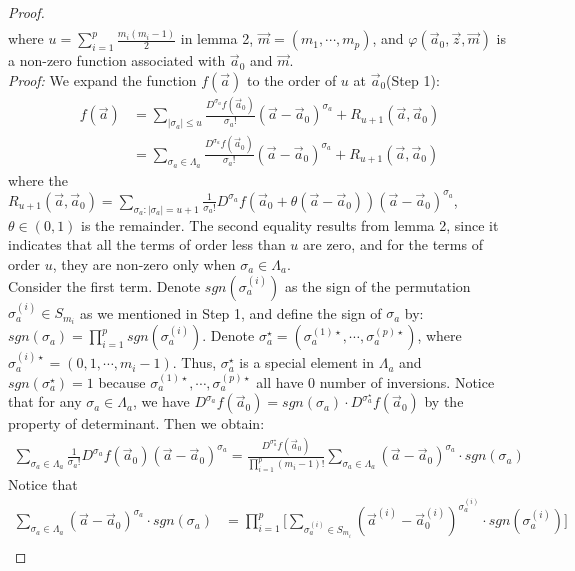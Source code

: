 \begin{proof}
\begin{align*}
\end{align*}
where $u=\sum_{i=1}^{p}\frac{m_{i}(m_{i}-1)}{2}$ in lemma 2, $\vec{m}=(m_{1},\cdots,m_{p})$, and $\varphi(\vec{a}_{0},\vec{z},\vec{m})$ is a non-zero function associated with $\vec{a}_{0}$ and $\vec{m}$.\\
\emph{Proof:} We expand the function $f(\vec{a})$ to the order of $u$ at $\vec{a}_{0}$(Step 1):
\begin{align*}
	f(\vec{a})&=\sum_{|\sigma_{a}|\leqslant u}\frac{D^{\sigma_{a}}f(\vec{a}_{0})}{\sigma_{a}!}(\vec{a}-\vec{a}_{0})^{\sigma_{a}}+R_{u+1}(\vec{a},\vec{a}_{0})\\
	&= \sum_{\sigma_{a}\in \Lambda_{a}}\frac{D^{\sigma_{a}}f(\vec{a}_{0})}{\sigma_{a}!}(\vec{a}-\vec{a}_{0})^{\sigma_{a}}+R_{u+1}(\vec{a},\vec{a}_{0})
\end{align*} 
where the $R_{u+1}(\vec{a},\vec{a}_{0})=\sum_{\sigma_{a}:|\sigma_{a}|=u+1}\frac{1}{\sigma_{a}!}D^{\sigma_{a}}f(\vec{a}_{0}+\theta(\vec{a}-\vec{a}_{0}))(\vec{a}-\vec{a}_{0})^{\sigma_{a}}$, $\theta\in(0,1)$ is the remainder. The second equality results from lemma 2, since it indicates that all the terms of order less than $u$ are zero, and for the terms of order $u$, they are non-zero only when $\sigma_{a}\in\Lambda_{a}$.\\
Consider the first term. Denote $sgn(\sigma_{a}^{(i)})$ as the sign of the permutation $\sigma_{a}^{(i)}\in S_{m_i}$ as we mentioned in Step 1, and define the sign of $\sigma_{a}$ by: $sgn(\sigma_{a})=\prod_{i=1}^{p}sgn(\sigma_{a}^{(i)})$. Denote $\sigma_{a}^{\star}=(\sigma_{a}^{(1)\star},\cdots,\sigma_{a}^{(p)\star})$, where $\sigma_{a}^{(i)\star}=(0,1,\cdots,m_i-1)$. Thus, $\sigma_{a}^{\star}$ is a special element in $\Lambda_{a}$ and $sgn(\sigma_{a}^{\star})=1$ because $\sigma_{a}^{(1)\star},\cdots,\sigma_{a}^{(p)\star}$ all have $0$ number of inversions. Notice that for any $\sigma_{a}\in\Lambda_{a}$, we have $D^{\sigma_{a}}f(\vec{a}_{0})=sgn(\sigma_{a})\cdot D^{\sigma_{a}^{\star}}f(\vec{a}_{0})$ by the property of determinant. Then we obtain:
\begin{align*}
	\sum_{\sigma_{a}\in\Lambda_{a}}\frac{1}{\sigma_{a}!}D^{\sigma_{a}}f(\vec{a}_{0})(\vec{a}-\vec{a}_{0})^{\sigma_{a}}=\frac{D^{\sigma_{a}^{\star}}f(\vec{a}_{0})}{\prod_{i=1}^{p}(m_{i}-1)!}\sum_{\sigma_{a}\in\Lambda_{a}}(\vec{a}-\vec{a}_{0})^{\sigma_{a}}\cdot sgn(\sigma_{a})
\end{align*}
Notice that 
\begin{align*}
	\sum_{\sigma_{a}\in\Lambda_{a}}(\vec{a}-\vec{a}_{0})^{\sigma_{a}}\cdot sgn(\sigma_{a})&=\prod_{i=1}^{p}\Big[\sum_{\sigma_{a}^{(i)}\in S_{m_i}}(\vec{a}^{(i)}-\vec{a}_{0}^{(i)})^{\sigma_{a}^{(i)}}\cdot sgn(\sigma_{a}^{(i)})\Big]\\

\end{align*}
\end{proof}
